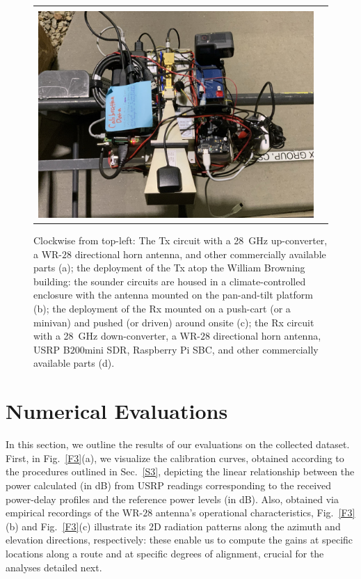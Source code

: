 \documentclass[10pt, twocolumn]{IEEEtran}
\begin{document}
\begin{figure}[t]
\begin{tabular}{cc}
\begin{minipage}{0.478\linewidth}
            \\ [0.55ex]
            \centering
            \includegraphics[width=0.8\linewidth]{figs/rx_cart_deployment.jpg}
        \end{minipage}
    \end{tabular}
    \caption{Clockwise from top-left: The Tx circuit with a \SI{28}{\giga\hertz} up-converter, a WR-$28$ directional horn antenna, and other commercially available parts (a); the deployment of the Tx atop the William Browning building: the sounder circuits are housed in a climate-controlled enclosure with the antenna mounted on the pan-and-tilt platform (b); the deployment of the Rx mounted on a push-cart (or a minivan) and pushed (or driven) around onsite (c); the Rx circuit with a \SI{28}{\giga\hertz} down-converter, a WR-$28$ directional horn antenna, USRP B$200$mini SDR, Raspberry Pi SBC, and other commercially available parts (d).}
    \label{F2}
    \vspace{-7mm}
\end{figure}
\vspace{-8mm}

\section{Numerical Evaluations}\label{S4}
In this section, we outline the results of our evaluations on the collected dataset. First, in Fig.~\ref{F3}(a), we visualize the calibration curves, obtained according to the procedures outlined in Sec.~\ref{S3}, depicting the linear relationship between the power calculated (in dB) from USRP readings corresponding to the received power-delay profiles and the reference power levels (in dB). Also, obtained via empirical recordings of the WR-$28$ antenna's operational characteristics, Fig.~\ref{F3}(b) and Fig.~\ref{F3}(c) illustrate its $2$D radiation patterns along the azimuth and elevation directions, respectively: these enable us to compute the gains at specific locations along a route and at specific degrees of alignment, crucial for the analyses detailed next.
\end{document}
